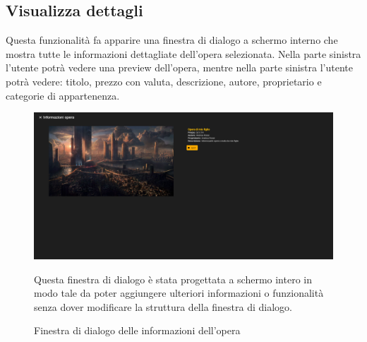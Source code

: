 \subsection{Visualizza dettagli}
Questa funzionalità fa apparire una finestra di dialogo a schermo interno che mostra tutte le informazioni dettagliate dell'opera selezionata. Nella parte sinistra l'utente potrà vedere una preview dell'opera, mentre nella parte sinistra l'utente potrà vedere: titolo, prezzo con valuta, descrizione, autore, proprietario e categorie di appartenenza.
\begin{figure}[H]
	\begin{center}
		\includegraphics[width=0.7\columnwidth]{immagini/dettagliHome.png}
		\caption{Finestra di dialogo delle informazioni dell'opera}
	\end{center}
	Questa finestra di dialogo è stata progettata a schermo intero in modo tale da poter aggiungere ulteriori informazioni o funzionalità senza dover modificare la struttura della finestra di dialogo.
\end{figure}
